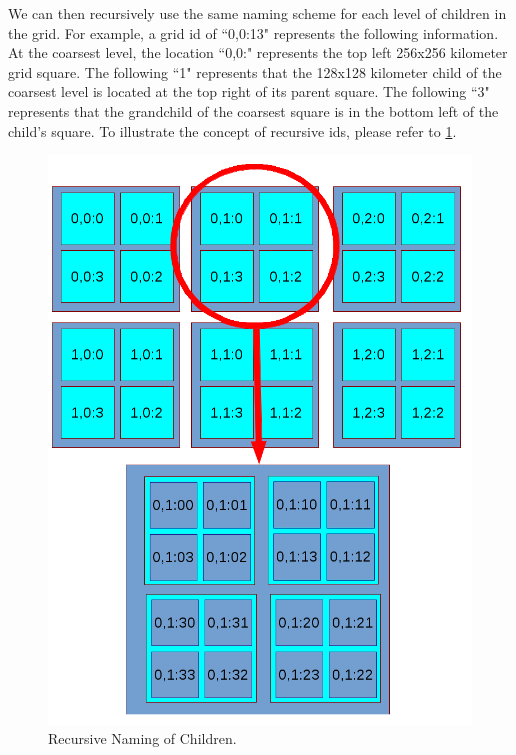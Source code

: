 We can then recursively use the same naming scheme for each level of children in the grid. For example, a grid id of ``0,0:13" represents the following information. At the coarsest level, the location ``0,0:" represents the top left 256x256 kilometer grid square. The following ``1" represents that the 128x128 kilometer child of the coarsest level is located at the top right of its parent square. The following ``3" represents that the grandchild of the coarsest square is in the bottom left of the child's square. To illustrate the concept of recursive ids, please refer to \ref{fig:second_children}.

\begin{figure}[htbp]
	\centering
	\includegraphics[width=0.8\columnwidth]{img/grid-sq-2.png}
	\caption{Recursive Naming of Children.}
	\label{fig:second_children}
\end{figure}

